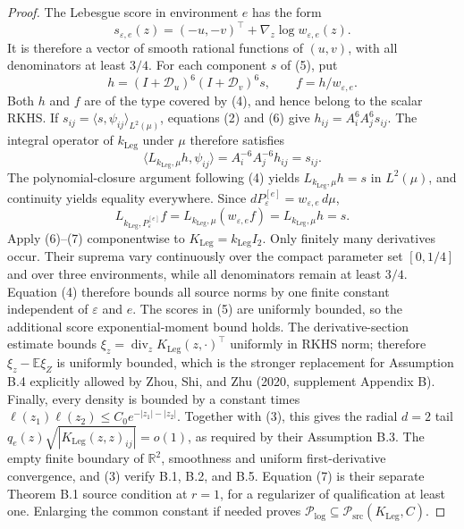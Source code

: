\documentclass{article}
\begin{document}
\begin{proof}
The Lebesgue score in environment \(e\) has the form
\[
 s_{\varepsilon,e}(z)=(-u,-v)^{\top}+\nabla_z\log w_{\varepsilon,e}(z).
 \tag{5}
\]
It is therefore a vector of smooth rational functions of \((u,v)\), with all denominators at least \(3/4\).  For each component \(s\) of (5), put
\[
 h=(I+\mathscr D_u)^6(I+\mathscr D_v)^6s,
 \qquad
 f=h/w_{\varepsilon,e}.
 \tag{6}
\]
Both \(h\) and \(f\) are of the type covered by (4), and hence belong to the scalar RKHS.  If \(s_{ij}=\langle s,\psi_{ij}\rangle_{L^2(\mu)}\), equations (2) and (6) give \(h_{ij}=A_i^6A_j^6s_{ij}\).  The integral operator of \(k_{\mathrm{Leg}}\) under \(\mu\) therefore satisfies
\[
 \langle L_{k_{\mathrm{Leg}},\mu}h,\psi_{ij}\rangle
 =A_i^{-6}A_j^{-6}h_{ij}=s_{ij}.
\]
The polynomial-closure argument following (4) yields \(L_{k_{\mathrm{Leg}},\mu}h=s\) in \(L^2(\mu)\), and continuity yields equality everywhere.  Since \(dP_{\varepsilon}^{[e]}=w_{\varepsilon,e}\,d\mu\),
\[
 L_{k_{\mathrm{Leg}},P_{\varepsilon}^{[e]}}f
 =L_{k_{\mathrm{Leg}},\mu}(w_{\varepsilon,e}f)
 =L_{k_{\mathrm{Leg}},\mu}h=s.
 \tag{7}
\]
Apply (6)--(7) componentwise to \(K_{\mathrm{Leg}}=k_{\mathrm{Leg}}I_2\).  Only finitely many derivatives occur.  Their suprema vary continuously over the compact parameter set \([0,1/4]\) and over three environments, while all denominators remain at least \(3/4\).  Equation (4) therefore bounds all source norms by one finite constant independent of \(\varepsilon\) and \(e\).  The scores in (5) are uniformly bounded, so the additional score exponential-moment bound holds. The derivative-section estimate bounds \(\xi_z=\operatorname{div}_zK_{\mathrm{Leg}}(z,\cdot)^\top\) uniformly in RKHS norm; therefore \(\xi_z-\mathbb E\xi_Z\) is uniformly bounded, which is the stronger replacement for Assumption B.4 explicitly allowed by Zhou, Shi, and Zhu (2020, supplement Appendix B). Finally, every density is bounded by a constant times \(\ell(z_1)\ell(z_2)\le C_0e^{-|z_1|-|z_2|}\). Together with (3), this gives the radial \(d=2\) tail \(q_e(z)\sqrt{|K_{\mathrm{Leg}}(z,z)_{ij}|}=o(1)\), as required by their Assumption B.3. The empty finite boundary of \(\mathbb R^2\), smoothness and uniform first-derivative convergence, and (3) verify B.1, B.2, and B.5. Equation (7) is their separate Theorem B.1 source condition at \(r=1\), for a regularizer of qualification at least one.  Enlarging the common constant if needed proves
\(
\mathcal P_{\mathrm{log}}\subseteq\mathcal P_{\mathrm{src}}(K_{\mathrm{Leg}},C)
\).


\end{proof}
\end{document}
